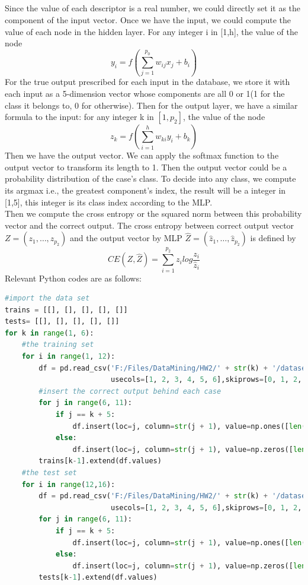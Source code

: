 \documentclass{article}
\begin{document}
 \subsection{}Since the value of each descriptor is a real number, we could directly set it as the component of the input vector. Once we have the input, we could compute the value of each node in the hidden layer. For any integer i in [1,h], the value of the node \[y_{i}=f(\sum\limits^{p_{0}}_{j=1}w_{ij}x_{j}+b_{i})\]
 For the true output prescribed for each input in the database, we store it with each input as a 5-dimension vector whose components are all 0 or 1(1 for the class it belongs to, 0 for otherwise).
 Then for the output layer, we have a similar formula to the input: for any integer k in $[1,p_{2}]$, the value of the node
 \[z_{k}=f(\sum\limits^{h}_{i=1}w_{ki}y_{i}+b_{k})\]
 Then we have the output vector.
 We can apply the softmax function to the output vector to transform its length to 1. Then the output vector could be a probability distribution of the case's class. To decide into any class, we compute its argmax i.e., the greatest component's index, the result will be a integer in [1,5], this integer is its class index according to the MLP.\\
 Then we compute the cross entropy or the squared norm between this probability vector and the correct output. The cross entropy between correct output vector $Z=(z_{1},\dots,z_{p_{2}})$ and the output vector by MLP $\hat{Z}=(\hat{z}_{1},\dots,\hat{z}_{p_{2}})$ is defined by
 \[CE(Z,\hat{Z})=\sum\limits^{p_{2}}_{i=1}z_{i}log\frac{z_{i}}{\hat{z}_{i}}\]
 Relevant Python codes are as follows:
 \begin{lstlisting}[language=Python]
#import the data set
trains = [[], [], [], [], []]
tests= [[], [], [], [], []]
for k in range(1, 6):
    #the training set
    for i in range(1, 12):
        df = pd.read_csv('F:/Files/DataMining/HW2/' + str(k) + '/dataset' + str(i) + '.csv',
                         usecols=[1, 2, 3, 4, 5, 6],skiprows=[0, 1, 2, 3, 4], header=None)
        #insert the correct output behind each case
        for j in range(6, 11):
            if j == k + 5:
                df.insert(loc=j, column=str(j + 1), value=np.ones([len(df), 1]))
            else:
                df.insert(loc=j, column=str(j + 1), value=np.zeros([len(df), 1]))
        trains[k-1].extend(df.values)
    #the test set
    for i in range(12,16):
        df = pd.read_csv('F:/Files/DataMining/HW2/' + str(k) + '/dataset' + str(i) + '.csv',
                         usecols=[1, 2, 3, 4, 5, 6],skiprows=[0, 1, 2, 3, 4], header=None)
        for j in range(6, 11):
            if j == k + 5:
                df.insert(loc=j, column=str(j + 1), value=np.ones([len(df), 1]))
            else:
                df.insert(loc=j, column=str(j + 1), value=np.zeros([len(df), 1]))
        tests[k-1].extend(df.values)
 \end{lstlisting}
\end{document}
